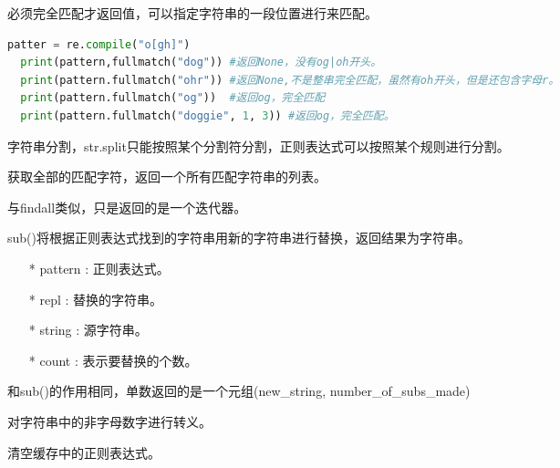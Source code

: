\noindent{\color{red}{re.fullmatch(pattern, string, flags=0):}}
\par{必须完全匹配才返回值，可以指定字符串的一段位置进行来匹配。}
\begin{lstlisting}[language=Python]
  patter = re.compile("o[gh]")
  print(pattern,fullmatch("dog")) #返回None，没有og|oh开头。
  print(pattern.fullmatch("ohr")) #返回None,不是整串完全匹配，虽然有oh开头，但是还包含字母r。
  print(pattern.fullmatch("og"))  #返回og，完全匹配
  print(pattern.fullmatch("doggie", 1, 3)) #返回og，完全匹配。
\end{lstlisting}

\noindent{\color{red}{re.split(pattern, string, maxsplit=0, flags=0):}}
\par{字符串分割，str.split只能按照某个分割符分割，正则表达式可以按照某个规则进行分割。}\\

\noindent{\color{red}{re.findall(pattern, string, flags=0):}}
\par{获取全部的匹配字符，返回一个所有匹配字符串的列表。}\\

\noindent{\color{red}{re.finditer(pattern, string, flags=0):}}
\par{与findall类似，只是返回的是一个迭代器。}\\

\noindent{\color{red}{re.sub(pattern, repl, string, count=0, flags=0):}}
\par{sub()将根据正则表达式找到的字符串用新的字符串进行替换，返回结果为字符串。}
\begin{itemize}
\item[*]{pattern : 正则表达式。}
\item[*]{repl : 替换的字符串。}
\item[*]{string : 源字符串。}
\item[*]{count : 表示要替换的个数。}
\end{itemize}

\noindent{\color{red}{re.subn(pattern, repl, string, count=0, flags=0):}}
\par{和sub()的作用相同，单数返回的是一个元组(new\_string, number\_of\_subs\_made)}\\

\noindent{\color{red}{re.escape(string):}}
\par{对字符串中的非字母数字进行转义。}\\

\noindent{\color{red}{re.purge():}}
\par{清空缓存中的正则表达式。}\\





